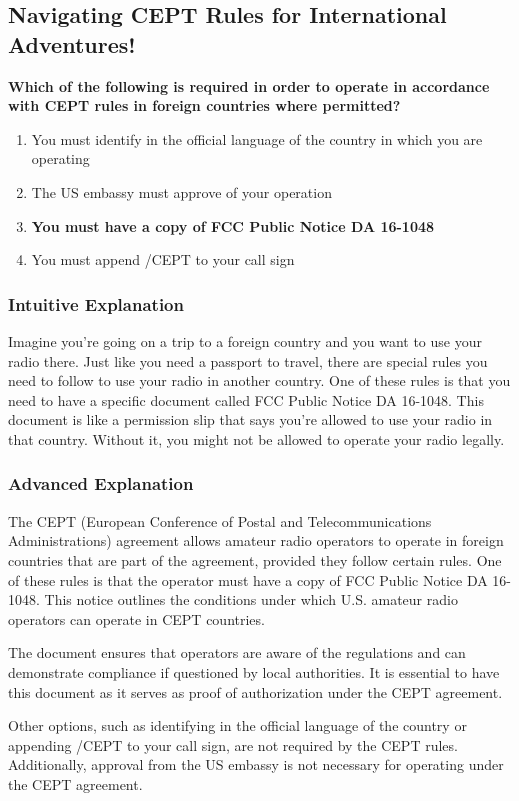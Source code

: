 \subsection{Navigating CEPT Rules for International Adventures!}

\begin{tcolorbox}[colback=gray!10!white,colframe=black!75!black,title=\textbf{E1C06}]
\textbf{Which of the following is required in order to operate in accordance with CEPT rules in foreign countries where permitted?}
\begin{enumerate}[label=\Alph*.]
    \item You must identify in the official language of the country in which you are operating
    \item The US embassy must approve of your operation
    \item \textbf{You must have a copy of FCC Public Notice DA 16-1048}
    \item You must append /CEPT to your call sign
\end{enumerate}
\end{tcolorbox}

\subsubsection{Intuitive Explanation}
Imagine you're going on a trip to a foreign country and you want to use your radio there. Just like you need a passport to travel, there are special rules you need to follow to use your radio in another country. One of these rules is that you need to have a specific document called FCC Public Notice DA 16-1048. This document is like a permission slip that says you're allowed to use your radio in that country. Without it, you might not be allowed to operate your radio legally.

\subsubsection{Advanced Explanation}
The CEPT (European Conference of Postal and Telecommunications Administrations) agreement allows amateur radio operators to operate in foreign countries that are part of the agreement, provided they follow certain rules. One of these rules is that the operator must have a copy of FCC Public Notice DA 16-1048. This notice outlines the conditions under which U.S. amateur radio operators can operate in CEPT countries. 

The document ensures that operators are aware of the regulations and can demonstrate compliance if questioned by local authorities. It is essential to have this document as it serves as proof of authorization under the CEPT agreement. 

Other options, such as identifying in the official language of the country or appending /CEPT to your call sign, are not required by the CEPT rules. Additionally, approval from the US embassy is not necessary for operating under the CEPT agreement.

